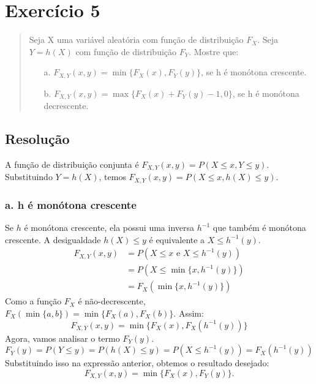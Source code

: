 \documentclass[12pt]{article}
\begin{document}
\pagebreak

\section{Exercício 5}

\begin{quote}
Seja X uma variável aleatória com função de distribuição $F_X$. Seja $Y=h(X)$ com função de distribuição $F_Y$. Mostre que:
\begin{itemize}
    \item[a.] $F_{X,Y}(x,y) = \min\{F_X(x), F_Y(y)\}$, se h é monótona crescente.
    \item[b.] $F_{X,Y}(x,y) = \max\{F_X(x) + F_Y(y) - 1, 0\}$, se h é monótona decrescente.
\end{itemize}
\end{quote}

\subsection*{Resolução}
A função de distribuição conjunta é $F_{X,Y}(x,y) = P(X \le x, Y \le y)$. Substituindo $Y=h(X)$, temos $F_{X,Y}(x,y) = P(X \le x, h(X) \le y)$.

\subsubsection*{a. h é monótona crescente}
Se $h$ é monótona crescente, ela possui uma inversa $h^{-1}$ que também é monótona crescente. A desigualdade $h(X) \le y$ é equivalente a $X \le h^{-1}(y)$.
\begin{align*}
    F_{X,Y}(x,y) &= P(X \le x \text{ e } X \le h^{-1}(y)) \\
    &= P(X \le \min\{x, h^{-1}(y)\}) \\
    &= F_X(\min\{x, h^{-1}(y)\})
\end{align*}
Como a função $F_X$ é não-decrescente, $F_X(\min\{a,b\}) = \min\{F_X(a), F_X(b)\}$. Assim:
\[ F_{X,Y}(x,y) = \min\{F_X(x), F_X(h^{-1}(y))\} \]
Agora, vamos analisar o termo $F_Y(y)$.
\[ F_Y(y) = P(Y \le y) = P(h(X) \le y) = P(X \le h^{-1}(y)) = F_X(h^{-1}(y)) \]
Substituindo isso na expressão anterior, obtemos o resultado desejado:
\[ F_{X,Y}(x,y) = \min\{F_X(x), F_Y(y)\}. \]
\end{document}
